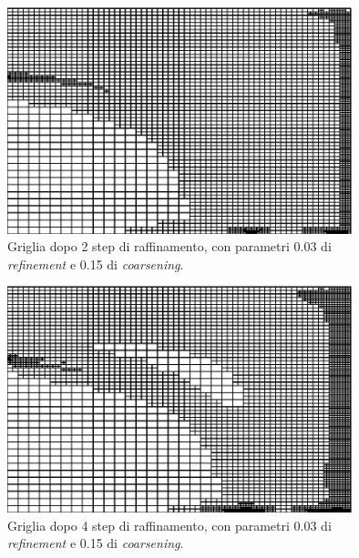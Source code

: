 \documentclass[a4paper,10pt]{report}
\theoremstyle{plain}
\theoremstyle{definition}
\theoremstyle{remark}
\begin{document}
\begin{figure}[htp!]
\begin{center}
\includegraphics[width=10cm]{img/meshes/Price2.eps}
\caption{Griglia dopo 2 step di raffinamento, con parametri 0.03 di \emph{refinement} e 0.15 di \emph{coarsening}.}
\label{fig:test5-price2}
\end{center}
\end{figure}
\begin{figure}[htp!]
\begin{center}
\includegraphics[width=10cm]{img/meshes/Price3.eps}
\caption{Griglia dopo 4 step di raffinamento, con parametri 0.03 di \emph{refinement} e 0.15 di \emph{coarsening}.}
\label{fig:test5-price3}
\end{center}
\end{figure}
\end{document}
